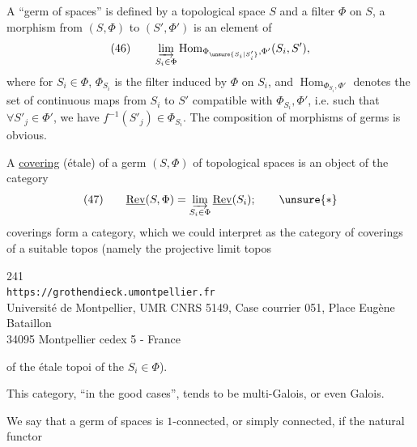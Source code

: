 
A ``germ of spaces'' is defined by a topological space $S$ and a  filter $\Phi$ on $S$, a morphism from $(S,\Phi)$ to $(S',\Phi')$ is an element of
\[
\text{(46)}\qquad
\varinjlim_{S_i\in\Phi}\operatorname{Hom}_{\Phi_{\unsure{S_i|S'_i}},\Phi'}(S_i,S'),
\]
where  for $S_i\in\Phi$, $\Phi_{S_i}$ is the filter induced by $\Phi$ on $S_i$, and $\operatorname{Hom}_{\Phi_{S_i},\Phi'}$ denotes the set of continuous maps  from $S_i$ to $S'$ compatible with $\Phi_{S_i},\Phi'$, i.e. such that $\forall S'_j\in\Phi'$,  we have $f^{-1}(S'_j)\in\Phi_{S_i}$. The composition of morphisms of germs is obvious.

A \uline{covering} (étale) of a germ $(S,\Phi)$ of topological spaces is an object of the category
\[
\text{(47)}\qquad
\underline{\mathrm{Rev}}(S,\Phi)=\varinjlim_{S_i\in\Phi}\underline{\mathrm{Rev}}(S_i);\qquad\unsure{*}
\]
 coverings form a category, which we could  interpret  as the category of coverings of a suitable topos (namely the projective limit topos

\begin{center}
241\\
\texttt{https://grothendieck.umontpellier.fr}\\
Université de Montpellier, UMR CNRS 5149, Case courrier 051, Place Eugène Bataillon\\
34095 Montpellier cedex 5 - France
\end{center}



of the  étale topoi of the $S_i\in\Phi$).

This category, ``in the good cases'', tends to be multi-Galois, or even Galois.

We say that a germ  of spaces is $1$-connected, or simply connected, if the natural functor


